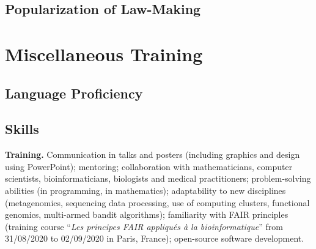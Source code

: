 \documentclass[11pt,a4paper,sans]{moderncv}
\begin{document}
\subsection{Popularization of Law-Making}

\section{Miscellaneous Training}
\subsection{Language Proficiency}
\subsection{Skills}
\textbf{Training.} Communication in talks and posters (including graphics and design using PowerPoint); mentoring; collaboration with mathematicians, computer scientists, bioinformaticians, biologists and medical practitioners; problem-solving abilities (in programming, in mathematics); adaptability to new disciplines (metagenomics, sequencing data processing, use of computing clusters, functional genomics, multi-armed bandit algorithms); familiarity with FAIR principles (training course “\textit{Les principes FAIR appliqués à la bioinformatique}” from 31/08/2020 to 02/09/2020 in Paris, France); open-source software development.
\end{document}
